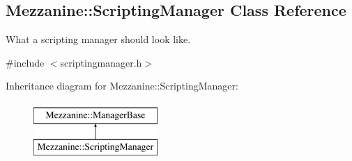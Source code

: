 \hypertarget{classMezzanine_1_1ScriptingManager}{
\subsection{Mezzanine::ScriptingManager Class Reference}
\label{classMezzanine_1_1ScriptingManager}
}


What a scripting manager should look like.  




{\ttfamily \#include $<$scriptingmanager.h$>$}

Inheritance diagram for Mezzanine::ScriptingManager:\begin{figure}[H]
\begin{center}
\leavevmode
\includegraphics[height=2.000000cm]{classMezzanine_1_1ScriptingManager}
\end{center}
\end{figure}
